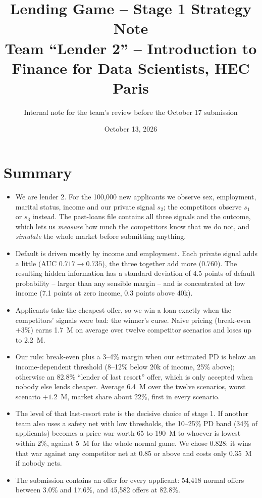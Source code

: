 \documentclass[11pt,a4paper]{article}
\title{Lending Game -- Stage 1 Strategy Note\\[2pt]
\large Team ``Lender 2'' -- Introduction to Finance for Data Scientists, HEC Paris}
\author{Internal note for the team's review before the October 17 submission}
\date{October 13, 2026}
\newcommand{\meur}{M\texteuro}
\begin{document}
\maketitle

\section*{Summary}
\begin{itemize}
  \item We are lender 2. For the 100,000 new applicants we observe sex, employment, marital status, income and our
        private signal $s_2$; the competitors observe $s_1$ or $s_3$ instead. The past-loans file contains all
        three signals and the outcome, which lets us \emph{measure} how much the competitors know that we do not,
        and \emph{simulate} the whole market before submitting anything.
  \item Default is driven mostly by income and employment. Each private signal adds a little (AUC $0.717 \to 0.735$),
        the three together add more ($0.760$). The resulting hidden information has a standard deviation of
        4.5 points of default probability -- larger than any sensible margin -- and is concentrated at low income
        (7.1 points at zero income, 0.3 points above 40k).
  \item Applicants take the cheapest offer, so we win a loan exactly when the competitors' signals were bad: the
        winner's curse. Naive pricing (break-even $+3\%$) earns 1.7~\meur{} on average over twelve competitor
        scenarios and loses up to 2.2~\meur{}.
  \item Our rule: break-even plus a 3--4\% margin when our estimated PD is below an income-dependent threshold
        (8--12\% below 20k of income, 25\% above); otherwise an 82.8\% ``lender of last resort'' offer, which is
        only accepted when nobody else lends cheaper. Average 6.4~\meur{} over the twelve scenarios, worst
        scenario $+1.2$~\meur{}, market share about 22\%, first in every scenario.
  \item The level of that last-resort rate is the decisive choice of stage 1. If another team also uses a safety
        net with low thresholds, the 10--25\% PD band (34\% of applicants) becomes a price war worth 65 to
        190~\meur{} to whoever is lowest within 2\%, against 5~\meur{} for the whole normal game. We chose 0.828:
        it wins that war against any competitor net at 0.85 or above and costs only 0.35~\meur{} if nobody nets.
  \item The submission contains an offer for every applicant: 54,418 normal offers between 3.0\% and 17.6\%,
        and 45,582 offers at 82.8\%.
\end{itemize}
\end{document}
